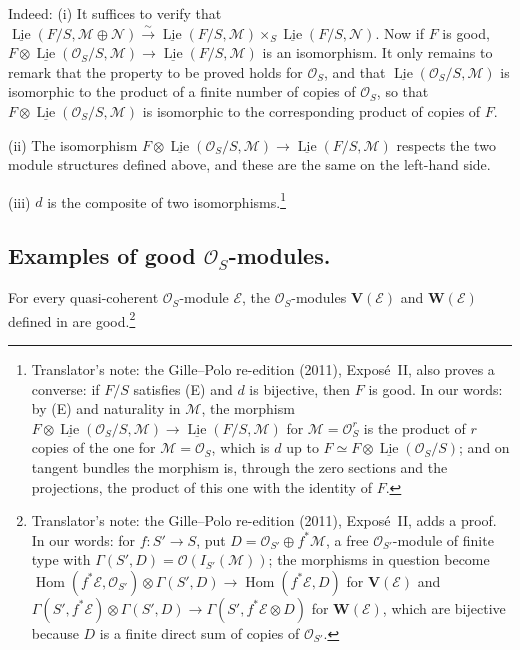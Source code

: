 Indeed: (i) It suffices to verify that
\(\underline{\operatorname{Lie}}(F/S,\mathcal M\oplus\mathcal N)
\xrightarrow{\sim}\underline{\operatorname{Lie}}(F/S,\mathcal M)\times_S
\underline{\operatorname{Lie}}(F/S,\mathcal N)\). Now if \(F\) is good,
\(F\otimes\underline{\operatorname{Lie}}(\mathcal O_S/S,\mathcal M)\to
\underline{\operatorname{Lie}}(F/S,\mathcal M)\) is an isomorphism. It only
remains to remark that the property to be proved holds for
\(\mathcal O_S\), and that
\(\underline{\operatorname{Lie}}(\mathcal O_S/S,\mathcal M)\) is isomorphic
to the product of a finite number of copies of \(\mathcal O_S\), so that
\(F\otimes\underline{\operatorname{Lie}}(\mathcal O_S/S,\mathcal M)\) is
isomorphic to the corresponding product of copies of \(F\).

(ii) The isomorphism
\(F\otimes\underline{\operatorname{Lie}}(\mathcal O_S/S,\mathcal M)\to
\underline{\operatorname{Lie}}(F/S,\mathcal M)\) respects the two module
structures defined above, and these are the same on the left-hand side.

(iii) \(d\) is the composite of two isomorphisms.\footnote{Translator's
note: the Gille--Polo re-edition (2011), Expos\'e~II, also proves a converse:
if \(F/S\) satisfies (E) and \(d\) is bijective, then \(F\) is good. In our
words: by (E) and naturality in \(\mathcal M\), the morphism
\(F\otimes\underline{\operatorname{Lie}}(\mathcal O_S/S,\mathcal M)\to
\underline{\operatorname{Lie}}(F/S,\mathcal M)\) for
\(\mathcal M=\mathcal O_S^r\) is the product of \(r\) copies of the one for
\(\mathcal M=\mathcal O_S\), which is \(d\) up to
\(F\simeq F\otimes\underline{\operatorname{Lie}}(\mathcal O_S/S)\); and on
tangent bundles the morphism is, through the zero sections and the
projections, the product of this one with the identity of \(F\).}

\subsection*{Examples of good \(\mathcal O_S\)-modules.}
For every quasi-coherent \(\mathcal O_S\)-module \(\mathcal E\), the
\(\mathcal O_S\)-modules \(\mathbf V(\mathcal E)\) and
\(\mathbf W(\mathcal E)\) defined in  are good.\footnote{Translator's
note: the Gille--Polo re-edition (2011), Expos\'e~II, adds a proof. In our
words: for \(f\colon S'\to S\), put
\(D=\mathcal O_{S'}\oplus f^*\mathcal M\), a free \(\mathcal O_{S'}\)-module
of finite type with \(\Gamma(S',D)=\mathcal O(I_{S'}(\mathcal M))\); the
morphisms in question become
\(\operatorname{Hom}(f^*\mathcal E,\mathcal O_{S'})\otimes\Gamma(S',D)\to
\operatorname{Hom}(f^*\mathcal E,D)\) for \(\mathbf V(\mathcal E)\) and
\(\Gamma(S',f^*\mathcal E)\otimes\Gamma(S',D)\to
\Gamma(S',f^*\mathcal E\otimes D)\) for \(\mathbf W(\mathcal E)\), which are
bijective because \(D\) is a finite direct sum of copies of
\(\mathcal O_{S'}\).}

